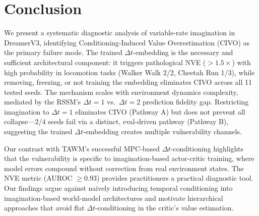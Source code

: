 \documentclass[10pt,letterpaper]{article}
\newcommand{\dt}{\Delta t}
\begin{document}
\section{Conclusion}

We present a systematic diagnostic analysis of variable-rate imagination in DreamerV3, identifying Conditioning-Induced Value Overestimation (CIVO) as the primary failure mode.
The trained $\dt$-embedding is the necessary and sufficient architectural component: it triggers pathological NVE ($> 1.5\times$) with high probability in locomotion tasks (Walker Walk 2/2, Cheetah Run 1/3), while removing, freezing, or not training the embedding eliminates CIVO across all 11 tested seeds.
The mechanism scales with environment dynamics complexity, mediated by the RSSM's $\dt{=}1$ vs.\ $\dt{=}2$ prediction fidelity gap.
Restricting imagination to $\dt{=}1$ eliminates CIVO (Pathway A) but does not prevent all collapse---2/4 seeds fail via a distinct, eval-driven pathway (Pathway B), suggesting the trained $\dt$-embedding creates multiple vulnerability channels.

Our contrast with TAWM's successful MPC-based $\dt$-conditioning highlights that the vulnerability is specific to imagination-based actor-critic training, where model errors compound without correction from real environment states.
The NVE metric (AUROC $\geq 0.93$) provides practitioners a practical diagnostic tool.
Our findings argue against naively introducing temporal conditioning into imagination-based world-model architectures and motivate hierarchical approaches that avoid flat $\dt$-conditioning in the critic's value estimation.


\end{document}

